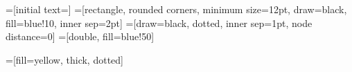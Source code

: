\newcommand{\resets}{R}
\newcommand{\projectP}[1]{\ensuremath{#1{\downarrow_{\Param}}}}
\newcommand{\reset}[2]{\ensuremath{[#1]_{#2}}}
\newcommand{\valuate}[2]{\ensuremath{#2(#1)}}
\newcommand{\wv}[2]{#1|#2} %


\newcommand{\stylealgo}[1]{\ensuremath{\textsf{#1}}}
\newcommand{\EFsynth}{\stylealgo{EFsynth}}
\newcommand{\TransWord}{\stylealgo{TW2PTA}} %

\newcommand{\replayTW}{\stylealgo{ReplayTW}}
\newcommand{\replayTrace}{\stylealgo{ReplayTrace}}

\newcommand{\ourMethod}{\stylealgo{Repair}}


\newcommand{\imitator}{\textsf{IMITATOR}\xspace}
\newcommand{\uppaal}{\textsc{Uppaal}}

\newenvironment{ienumeration}
{\ifdefined\VersionLong\begin{enumerate}\else\begin{inparaenum}[\itshape i\upshape)]\fi} %
		{\ifdefined\VersionLong\end{enumerate}\else\end{inparaenum}\fi}

\newenvironment{oneenumeration}
{\ifdefined\VersionLong\begin{enumerate}\else\begin{inparaenum}[1)]\fi}
		{\ifdefined\VersionLong\end{enumerate}\else\end{inparaenum}\fi}

\usetikzlibrary{arrows,automata,positioning,shapes} %
=[initial text=]
=[rectangle, rounded corners, minimum size=12pt, draw=black, fill=blue!10, inner sep=2pt]
=[draw=black, dotted, inner sep=1pt, node distance=0] %
=[double, fill=blue!50]

=[fill=yellow, thick, dotted] %


